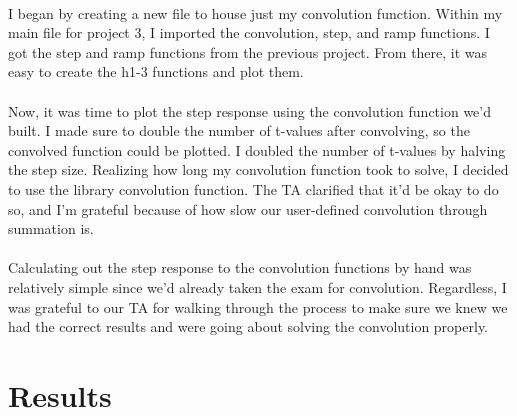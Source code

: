 \documentclass[12pt]{report}
\begin{document}

    \paragraph{} I began by creating a new file to house just my convolution function. Within my main file for project 3, I imported the convolution, step, and ramp functions. I got the step and ramp functions from the previous project. From there, it was easy to create the h1-3 functions and plot them.  

    \paragraph{} Now, it was time to plot the step response using the convolution function we'd built. I made sure to double the number of t-values after convolving, so the convolved function could be plotted. I doubled the number of t-values by halving the step size. Realizing how long my convolution function took to solve, I decided to use the library convolution function. The TA clarified that it'd be okay to do so, and I'm grateful because of how slow our user-defined convolution through summation is.      
    
    \paragraph{} Calculating out the step response to the convolution functions by hand was relatively simple since we'd already taken the exam for convolution. Regardless, I was grateful to our TA for walking through the process to make sure we knew we had the correct results and were going about solving the convolution properly. 
    
\section{Results}

\end{document}

